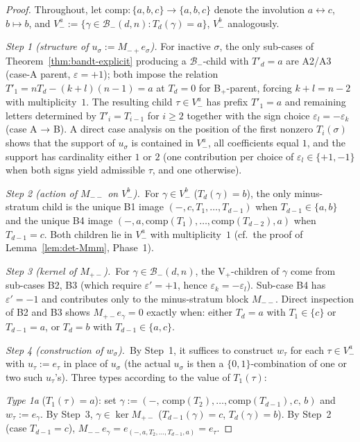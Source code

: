 \documentclass{amsart}
\theoremstyle{definition}
\theoremstyle{remark}
\begin{document}
\begin{proof}
Throughout, let $\mathrm{comp} : \{a, b, c\} \to \{a, b, c\}$
denote the involution $a \leftrightarrow c$, $b \mapsto b$, and
$V_-^a := \{\gamma \in \mathcal{B}_-(d, n) : T_d(\gamma) = a\}$,
$V_-^b$ analogously.

\textit{Step 1 (structure of $u_\sigma := M_{-+} e_\sigma$).}
For inactive $\sigma$, the only sub-cases of
Theorem~\ref{thm:bandt-explicit} producing a $\mathcal{B}_-$-child
with $T'_d = a$ are A2/A3 (case-A parent, $\varepsilon = +1$);
both impose the relation $T'_1 = n T_d - (k + l)(n - 1) = a$ at
$T_d = 0$ for B$_+$-parent, forcing $k + l = n - 2$ with
multiplicity~$1$.  The resulting child $\tau \in V_-^a$ has
prefix $T'_1 = a$ and remaining letters determined by
$T'_i = T_{i-1}$ for $i \ge 2$ together with the sign choice
$\varepsilon_l = -\varepsilon_k$ (case A → B).  A direct case
analysis on the position of the first nonzero $T_i(\sigma)$
shows that the support of $u_\sigma$ is contained in $V_-^a$,
all coefficients equal $1$, and the support has cardinality
either $1$ or $2$ (one contribution per choice of
$\varepsilon_l \in \{+1, -1\}$ when both signs yield admissible
$\tau$, and one otherwise).

\textit{Step 2 (action of $M_{--}$ on $V_-^b$).}\
For $\gamma \in V_-^b$ ($T_d(\gamma) = b$), the only minus-stratum
child is the unique B1 image $(-, c, T_1, \ldots, T_{d-1})$ when
$T_{d-1} \in \{a, b\}$ and the unique B4 image
$(-, a, \mathrm{comp}(T_1), \ldots, \mathrm{comp}(T_{d-2}), a)$
when $T_{d-1} = c$.  Both children lie in $V_-^a$ with
multiplicity~$1$ (cf.~the proof of
Lemma~\ref{lem:det-Mmm}, Phase~1).

\textit{Step 3 (kernel of $M_{+-}$).}\
For $\gamma \in \mathcal{B}_-(d, n)$, the V$_+$-children of
$\gamma$ come from sub-cases B2, B3 (which require
$\varepsilon' = +1$, hence $\varepsilon_k = -\varepsilon_l$).
Sub-case B4 has $\varepsilon'=-1$ and contributes only to the
minus-stratum block $M_{--}$.  Direct inspection of B2 and B3
shows $M_{+-} e_\gamma = 0$ exactly when:
either $T_d = a$ with $T_1 \in \{c\}$ or $T_{d-1} = a$, or
$T_d = b$ with $T_{d-1} \in \{a, c\}$.

\textit{Step 4 (construction of $w_\sigma$).}\
By Step~1, it suffices to construct $w_\tau$ for each
$\tau \in V_-^a$ with $u_\tau := e_\tau$ in place of $u_\sigma$
(the actual $u_\sigma$ is then a $\{0, 1\}$-combination of one or
two such $u_\tau$'s).  Three types according to the value of
$T_1(\tau)$:

\smallskip
\textit{Type 1a} ($T_1(\tau) = a$): set
$\gamma := (-,\, \mathrm{comp}(T_2), \ldots, \mathrm{comp}(T_{d-1}),
c,\, b)$ and $w_\tau := e_\gamma$.
By Step~3, $\gamma \in \ker M_{+-}$ ($T_{d-1}(\gamma) = c$,
$T_d(\gamma) = b$).  By Step~2 (case $T_{d-1} = c$),
$M_{--} e_\gamma = e_{(-, a, T_2, \ldots, T_{d-1}, a)} = e_\tau$.


\end{proof}
\end{document}
